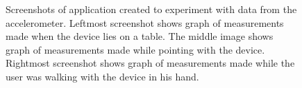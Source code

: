 \begin{figure}[!htb]%
    \centering
    \caption{Screenshots of application created to experiment with data from the accelerometer. Leftmost screenshot shows graph of measurements made when the device lies on a table. The middle image shows graph of measurements made while pointing with the device. Rightmost screenshot shows graph of measurements made while the user was walking with the device in his hand.}
    \label{fig:gesture-recognition:pointer}
\end{figure}


